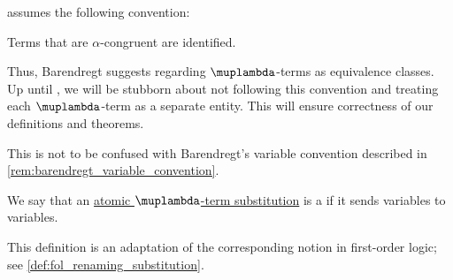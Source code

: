 \begin{remark}\label{rem:barendregt_convention}
  \Textcite[\S 2.1.12]{Barendregt1984LambdaCalculus} assumes the following convention:
  \begin{displayquote}
    Terms that are \( \alpha \)-congruent are identified.
  \end{displayquote}

  Thus, Barendregt suggests regarding \( \muplambda \)-terms as equivalence classes. Up until , we will be stubborn about not following this convention and treating each \( \muplambda \)-term as a separate entity. This will ensure correctness of our definitions and theorems.
\end{remark}
\begin{comments}
  \item This is not to be confused with Barendregt's variable convention described in \cref{rem:barendregt_variable_convention}.
\end{comments}

\begin{definition}\label{def:lambda_renaming_substitution}\mimprovised
  We say that an \hyperref[def:atomic_lambda_term_substitution]{atomic \( \muplambda \)-term substitution} is a  if it sends variables to variables.
\end{definition}
\begin{comments}
  \item This definition is an adaptation of the corresponding notion in first-order logic; see \cref{def:fol_renaming_substitution}.
\end{comments}

